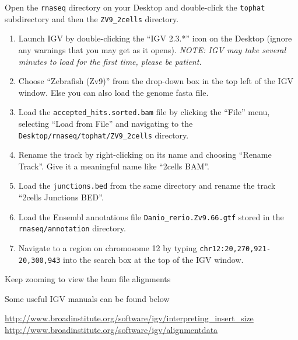 \begin{steps}
Open the \texttt{rnaseq} directory on your Desktop and double-click the
\texttt{tophat} subdirectory and then the \texttt{ZV9\_2cells} directory.

\begin{enumerate}
  \item Launch IGV by double-clicking the ``IGV 2.3.*'' icon on the Desktop
  (ignore any warnings that you may get as it opens). \emph{NOTE: IGV may take
  several minutes to load for the first time, please be patient.}
  \item Choose ``Zebrafish (Zv9)'' from the drop-down box in the top left of the
  IGV window. Else you can also load the genome fasta file.
  \item Load the \texttt{accepted\_hits.sorted.bam} file by clicking the
  ``File'' menu, selecting ``Load from File'' and navigating to the
  \texttt{Desktop/rnaseq/tophat/ZV9\_2cells} directory.
  \item Rename the track by right-clicking on its name and choosing ``Rename
  Track''. Give it a meaningful name like ``2cells BAM''.
  \item Load the \texttt{junctions.bed} from the same directory and rename the
  track ``2cells Junctions BED''.
  \item Load the Ensembl annotations file \texttt{Danio\_rerio.Zv9.66.gtf}
  stored in the \texttt{rnaseq/annotation} directory.
  \item Navigate to a region on chromosome 12 by typing
  \texttt{chr12:20,270,921-20,300,943} into the search box at the top of the IGV
  window.
\end{enumerate}

\end{steps}

\begin{information}
Keep zooming to view the bam file alignments

Some useful IGV manuals can be found below

\url{http://www.broadinstitute.org/software/igv/interpreting_insert_size}\\
\url{http://www.broadinstitute.org/software/igv/alignmentdata}
\end{information}

